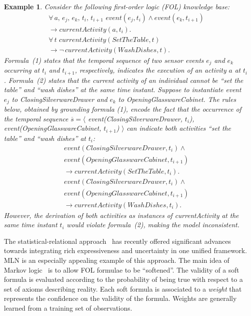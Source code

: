 \documentclass[10pt, conference, compsocconf]{IEEEtran}
\newtheorem{example}{Example}
\begin{document}
\begin{example}
\label{ex:act}
Consider the following first-order logic (FOL) knowledge base:
\begin{eqnarray}
\forall \, a, \, e_{j}, \, e_{k}, \, t_i, \, t_{i+1} \,\, event(e_{j}, t_i) \wedge event(e_{k}, t_{i+1}) 
\\\nonumber \rightarrow currentActivity(a, t_i).\\
\forall \, t \,\, currentActivity(SetTheTable, t) 
\\\nonumber \rightarrow \neg \, currentActivity(WashDishes, t).
\end{eqnarray}
Formula~(1) states that the temporal sequence of two sensor events $e_j$ and $e_k$ occurring at $t_i$
and $t_{i+1}$, respectively, indicates the execution of an activity $a$ at $t_i$. 
Formula~(2) states that the current activity of an individual cannot be ``set the table''
and ``wash dishes'' at the same time instant.
Suppose to instantiate event $e_{j}$ to \emph{ClosingSilverwareDrawer} and $e_k$ to 
\emph{OpeningGlasswareCabinet}. 
The rules below, obtained by grounding formula (1), encode the fact that the occurrence 
of the temporal sequence $\overline{s} = \langle$ \emph{event(ClosingSilverwareDrawer, $t_i$)}, 
\emph{event(OpeningGlasswareCabinet, $t_{i+1}$)} $\rangle$ can indicate both activities 
``set the table'' and ``wash dishes'' at $t_i$:
\begin{eqnarray}
event(ClosingSilverwareDrawer, t_i) \wedge 
\\\nonumber event(OpeningGlasswareCabinet, t_{i+1}) 
\\\nonumber \rightarrow currentActivity(SetTheTable, t_i).\\
event(ClosingSilverwareDrawer, t_i) \wedge 
\\\nonumber event(OpeningGlasswareCabinet, t_{i+1}) 
\\\nonumber \rightarrow currentActivity(WashDishes, t_i).
\end{eqnarray}
However, the derivation of both activities as instances of \emph{currentActivity} at the same 
time instant $t_i$ would violate formula~(2), making the model inconsistent. 
\end{example}


The statistical-relational approach~\cite{Getoor2007} has recently offered significant advances towards integrating rich expressiveness and uncertainty in one unified framework. MLN is an especially appealing example of this approach. 
The main idea of Markov logic~\cite{Domingos2004} is to allow FOL formulae to be ``softened''.
The validity of a soft formula is evaluated according to the probability of being true with 
respect to a set of axioms describing reality. 
Each soft formula is associated to a \emph{weight} that represents the confidence on 
the validity of the formula.
Weights are generally learned from a training set of
observations.
\end{document}
